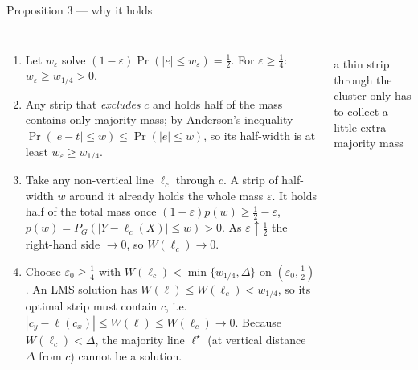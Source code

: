 \documentclass[aspectratio=169,9pt]{beamer}
\begin{document}
\begin{frame}{Proposition 3 --- why it holds}
\begin{columns}[T]
\begin{enumerate}\setlength\itemsep{4pt}\small
\item Let $w_\varepsilon$ solve $(1-\varepsilon)\Pr(|e|\le w_\varepsilon)=\tfrac12$. For $\varepsilon\ge\tfrac14$: $w_\varepsilon\ge w_{1/4}>0$.
\item Any strip that \emph{excludes} $c$ and holds half of the mass contains only majority mass; by Anderson's inequality $\Pr(|e-t|\le w)\le\Pr(|e|\le w)$, so its half-width is at least $w_\varepsilon\ge w_{1/4}$.
\item Take any non-vertical line $\ell_c$ through $c$. A strip of half-width $w$ around it already holds the whole mass $\varepsilon$. It holds half of the total mass once $(1-\varepsilon)p(w)\ge\tfrac12-\varepsilon$, $p(w)=P_G(|Y-\ell_c(X)|\le w)>0$. As $\varepsilon\uparrow\tfrac12$ the right-hand side $\to0$, so $W(\ell_c)\to0$.
\item Choose $\varepsilon_0\ge\tfrac14$ with $W(\ell_c)<\min\{w_{1/4},\Delta\}$ on $(\varepsilon_0,\tfrac12)$. An LMS solution has $W(\ell)\le W(\ell_c)<w_{1/4}$, so its optimal strip must contain $c$, i.e.\ $|c_y-\ell(c_x)|\le W(\ell)\le W(\ell_c)\to0$. Because $W(\ell_c)<\Delta$, the majority line $\ell^\star$ (at vertical distance $\Delta$ from $c$) cannot be a solution.
\end{enumerate}
\\[2pt]
{\sffamily\scriptsize\color{mute}a thin strip through the cluster only has to collect a little extra majority mass}
\end{columns}
\end{frame}
\end{document}
